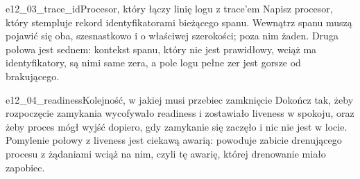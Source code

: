 \begin{exercise}{e12_03_trace_id}{Procesor, który łączy linię logu z trace'em}
Napisz procesor, który stempluje rekord identyfikatorami bieżącego spanu.
Wewnątrz spanu muszą pojawić się oba, szesnastkowo i o właściwej szerokości;
poza nim żaden. Druga połowa jest sednem: kontekst spanu, który nie jest
prawidłowy, wciąż ma identyfikatory, są nimi same zera, a pole logu pełne
zer jest gorsze od brakującego.
\end{exercise}

\begin{exercise}{e12_04_readiness}{Kolejność, w jakiej musi przebiec zamknięcie}
Dokończ  tak, żeby rozpoczęcie zamykania wycofywało
readiness i zostawiało liveness w spokoju, oraz żeby proces mógł wyjść
dopiero, gdy zamykanie się zaczęło i nic nie jest w locie. Pomylenie połowy
z liveness jest ciekawą awarią: powoduje zabicie drenującego procesu z
żądaniami wciąż na nim, czyli tę awarię, której drenowanie miało zapobiec.
\end{exercise}
